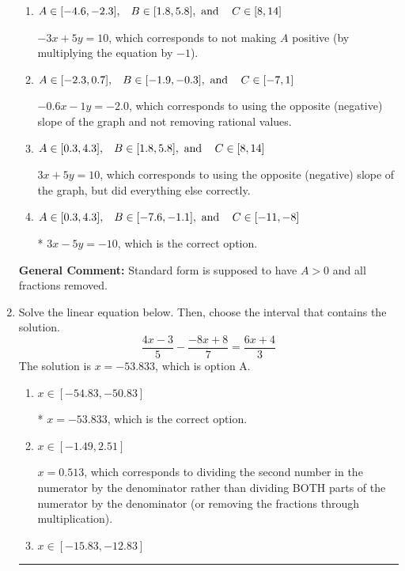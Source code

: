 \documentclass{extbook}[14pt]
\newcommand{\litem}[1]{\item #1

\rule{\textwidth}{0.4pt}}
\begin{document}
\begin{enumerate}
{\begin{enumerate}[label=\Alph*.]
 $-0.6x + 1y = 2.0$, which corresponds to not removing rational values for Standard Form.
\item \( A \in [-4.6, -2.3], \hspace{3mm} B \in [1.8, 5.8], \text{ and } \hspace{3mm} C \in [8, 14] \)

 $-3x + 5y = 10$, which corresponds to not making $A$ positive (by multiplying the equation by $-1$).
\item \( A \in [-2.3, 0.7], \hspace{3mm} B \in [-1.9, -0.3], \text{ and } \hspace{3mm} C \in [-7, 1] \)

 $-0.6x - 1y = -2.0$, which corresponds to using the opposite (negative) slope of the graph and not removing rational values.
\item \( A \in [0.3, 4.3], \hspace{3mm} B \in [1.8, 5.8], \text{ and } \hspace{3mm} C \in [8, 14] \)

 $3x + 5y = 10$, which corresponds to using the opposite (negative) slope of the graph, but did everything else correctly.
\item \( A \in [0.3, 4.3], \hspace{3mm} B \in [-7.6, -1.1], \text{ and } \hspace{3mm} C \in [-11, -8] \)

* $3x - 5y = -10$, which is the correct option.
\end{enumerate}

\textbf{General Comment:} Standard form is supposed to have $A > 0$ and all fractions removed.
}
\litem{
Solve the linear equation below. Then, choose the interval that contains the solution.
\[ \frac{4x -3}{5} - \frac{-8x + 8}{7} = \frac{6x + 4}{3} \]
The solution is \( x = -53.833 \), which is option A.\begin{enumerate}[label=\Alph*.]
\item \( x \in [-54.83, -50.83] \)

* $x = -53.833$, which is the correct option.
\item \( x \in [-1.49, 2.51] \)

 $x = 0.513$, which corresponds to dividing the second number in the numerator by the denominator rather than dividing BOTH parts of the numerator by the denominator (or removing the fractions through multiplication).
\item \( x \in [-15.83, -12.83] \)


\end{enumerate}}
\end{enumerate}
\end{document}
